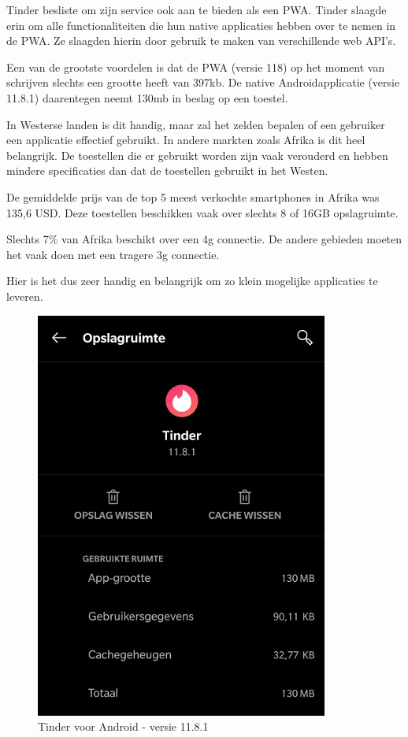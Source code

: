 	Tinder besliste om zijn service ook aan te bieden als een PWA. Tinder slaagde erin om alle functionaliteiten die hun native applicaties hebben over te nemen in de PWA. Ze slaagden hierin door gebruik te maken van verschillende web API’s. 
	\autocite{Osmani2017}
	
	Een van de grootste voordelen is dat de PWA (versie 118) op het moment van schrijven slechts een grootte heeft van 397kb. De native Androidapplicatie (versie 11.8.1) daarentegen neemt 130mb in beslag op een toestel.
	
	In Westerse landen is dit handig, maar zal het zelden bepalen of een gebruiker een applicatie effectief gebruikt. In andere markten zoals Afrika is dit heel belangrijk. De toestellen die er gebruikt worden zijn vaak verouderd en hebben mindere specificaties dan dat de toestellen gebruikt in het Westen. 
	
	De gemiddelde prijs van de top 5 meest verkochte smartphones in Afrika was 135,6 USD. Deze toestellen beschikken vaak over slechts 8 of 16GB opslagruimte. 
	\autocite{netAdmin2017}
	
	Slechts 7\% van Afrika beschikt over een 4g connectie. De andere gebieden moeten het vaak doen met een tragere 3g connectie.	
	
	\autocite{gsmArena2020}

	
	Hier is het dus zeer handig en belangrijk om zo klein mogelijke applicaties te leveren.
	
	\begin{figure}[H]
		\centering
		\includegraphics{./img/tinder_native.png}
		\caption{Tinder voor Android -  versie 11.8.1}
	\end{figure}
	
